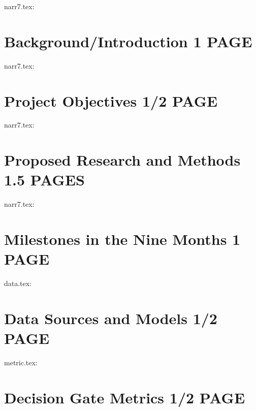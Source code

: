 
narr7.tex: \section{Background/Introduction             1 PAGE}

narr7.tex: \section{Project Objectives                1/2 PAGE}

narr7.tex: \section{Proposed Research and Methods     1.5 PAGES}

narr7.tex: \section{Milestones in the Nine Months       1 PAGE}

data.tex:  \section{Data Sources and Models           1/2 PAGE}

metric.tex:\section{Decision Gate Metrics             1/2 PAGE}
